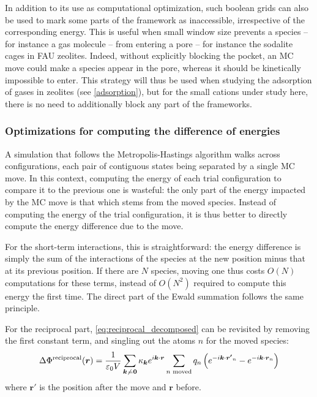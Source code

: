 \documentclass[main.tex]{subfiles}
\begin{document}
In addition to its use as computational optimization, such boolean grids can also be used to mark some parts of the framework as inaccessible, irrespective of the corresponding energy. This is useful when small window size prevents a species -- for instance a gas molecule -- from entering a pore -- for instance the sodalite cages in FAU zeolites. Indeed, without explicitly blocking the pocket, an MC move could make a species appear in the pore, whereas it should be kinetically impossible to enter. This strategy will thus be used when studying the adsorption of gases in zeolites (see \autoref{adsorption}), but for the small cations under study here, there is no need to additionally block any part of the frameworks.

\subsubsection{Optimizations for computing the difference of energies}

A simulation that follows the Metropolis-Hastings algorithm walks across configurations, each pair of contiguous states being separated by a single MC move. In this context, computing the energy of each trial configuration to compare it to the previous one is wasteful: the only part of the energy impacted by the MC move is that which stems from the moved species. Instead of computing the energy of the trial configuration, it is thus better to directly compute the energy difference due to the move.

For the short-term interactions, this is straightforward: the energy difference is simply the sum of the interactions of the species at the new position minus that at its previous position. If there are $N$ species, moving one thus costs $O(N)$ computations for these terms, instead of $O(N^2)$ required to compute this energy the first time. The direct part of the Ewald summation follows the same principle.

For the reciprocal part, \autoref{eq:reciprocal_decomposed} can be revisited by removing the first constant term, and singling out the atoms $n$ for the moved species:
\[\Delta\Phi^\text{reciprocal}(\boldsymbol{r}) = \frac1{\varepsilon_0V}\sum_{\boldsymbol{k}\not\kern0.2ex=\boldsymbol{0}} \kappa_{\boldsymbol k}e^{i\boldsymbol k\cdot\boldsymbol{r}} \sum_{n\text{ moved}}q_n\left(e^{-i\boldsymbol k\cdot\boldsymbol{r'}_n} - e^{-i\boldsymbol k\cdot\boldsymbol r_n}\right)\]
where $\boldsymbol{r'}$ is the position after the move and $\boldsymbol{r}$ before.
\end{document}
